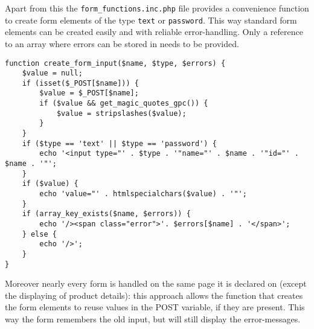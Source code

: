 Apart from this the \texttt{form\_functions.inc.php} file provides a convenience function to create form elements of the type \texttt{text} or \texttt{password}. This way standard form elements can be created easily and with reliable error-handling. Only a reference to an array where errors can be stored in needs to be provided.

\begin{lstlisting}
function create_form_input($name, $type, $errors) {
	$value = null;
	if (isset($_POST[$name])) {
		$value = $_POST[$name];
		if ($value && get_magic_quotes_gpc()) {
			$value = stripslashes($value);
		}
	}
	if ($type == 'text' || $type == 'password') {
		echo '<input type="' . $type . '"name="' . $name . '"id="' . $name . '"';
	}
	if ($value) {
		echo 'value="' . htmlspecialchars($value) . '"';
	}
	if (array_key_exists($name, $errors)) {
		echo '/><span class="error">'. $errors[$name] . '</span>';
	} else {
		echo '/>';
	}
}
\end{lstlisting}

Moreover nearly every form is handled on the same page it is declared on (except the displaying of product details): this approach allows the function that creates the form elements to reuse values in the POST variable, if they are present. This way the form remembers the old input, but will still display the error-messages.
